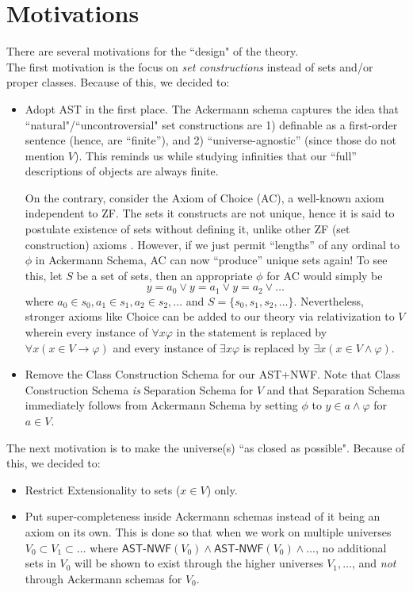 \documentclass{article}
\begin{document}
\section{Motivations}
There are several motivations for the ``design" of the theory.\\

The first motivation is the focus on \textit{set constructions} instead of sets and/or proper classes. Because of this, we decided to:
\begin{itemize}
\item Adopt AST in the first place. The Ackermann schema captures the idea that ``natural"/``uncontroversial" set constructions are 1) definable as a first-order sentence (hence, are ``finite''), and 2) ``universe-agnostic'' (since those do not mention $V$). This reminds us while studying infinities that our ``full'' descriptions of objects are always finite.

On the contrary, consider the Axiom of Choice (AC), a well-known axiom independent to ZF. The sets it constructs are not unique, hence it is said to postulate existence of sets without defining it, unlike other ZF (set construction) axioms \cite[Chapter 5]{jech}. However, if we just permit ``lengths'' of any ordinal to $\phi$ in Ackermann Schema, AC can now ``produce'' unique sets again! To see this, let $S$ be a set of sets, then an appropriate $\phi$ for AC would simply be $$y = a_0 \vee y = a_1 \vee y = a_2 \vee \ldots$$ where $a_0 \in s_0, a_1 \in s_1, a_2 \in s_2, \ldots$ and $S=\{s_0, s_1, s_2, \ldots\}$. Nevertheless, stronger axioms like Choice can be added to our theory via relativization to $V$ wherein every instance of $\forall x \varphi$ in the statement is replaced by $\forall x (x \in V \rightarrow \varphi)$ and every instance of $\exists x \varphi$ is replaced by $\exists x (x \in V \wedge \varphi)$.
\item Remove the Class Construction Schema for our \textsf{AST+NWF}. Note that Class Construction Schema \textit{is} Separation Schema for $V$ and that Separation Schema immediately follows from Ackermann Schema by setting $\phi$ to $y \in a \wedge \varphi$ for $a\in V$.
\end{itemize}

The next motivation is to make the universe(s) ``as closed as possible". Because of this, we decided to:
\begin{itemize}
\item Restrict Extensionality to sets ($x \in V$) only.
\item Put super-completeness inside Ackermann schemas instead of it being an axiom on its own. This is done so that when we work on multiple universes $V_0 \subset V_1 \subset \ldots$ where $ \textsf{AST-NWF}(V_0) \wedge \textsf{AST-NWF}(V_0) \wedge\ldots$, no additional sets in $V_0$ will be shown to exist through the higher universes $V_1, \ldots$, and \textit{not} through Ackermann schemas for $V_0$.
\end{itemize}
\end{document}
